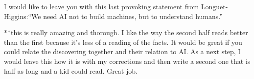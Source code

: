 \documentclass[]{book}
\theoremstyle{definition}
\theoremstyle{definition}
\theoremstyle{definition}
\theoremstyle{remark}
\begin{document}
I would like to leave you with this last provoking statement from
Longuet-Higgins:``We need AI not to build machines, but to understand
humans.''

**this is really amazing and thorough. I like the way the second half
reads better than the first because it's less of a reading of the facts.
It would be great if you could relate the discovering together and their
relation to AI. As a next step, I would leave this how it is with my
corrections and then write a second one that is half as long and a kid
could read. Great job.


\end{document}
